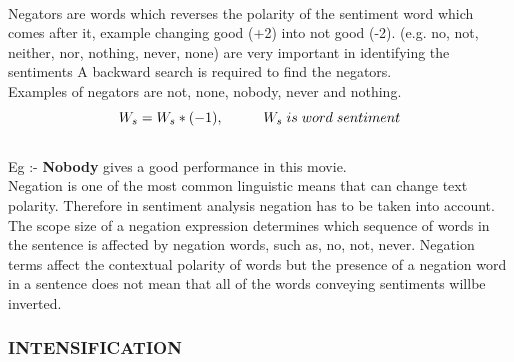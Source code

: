 \paragraph{}  Negators are words which reverses the polarity of the sentiment word which comes after it, example changing good (+2)
into not good (-2). (e.g. no, not, neither, nor, nothing, never,
none) are very important in identifying the sentiments
A backward search is required to find the negators.
\\
Examples of negators are not, none, nobody, never and nothing.
\begin{equation}
W_s = W_s * (-1), \hspace{1cm} W_s  \hspace{0.1cm}is \hspace{0.1cm}  word \hspace{0.1cm} sentiment
\end{equation}
\\
Eg :- \textbf{Nobody} gives a good performance in this movie.
\\
Negation is one of the most common linguistic means that can change text polarity. Therefore in sentiment analysis negation has to be  taken into account. The  scope size of a negation expression determines which sequence of words in the sentence is affected by negation words, such as, no, not, never. Negation terms affect the contextual polarity of words but the presence of a negation  word  in  a  sentence  does  not  mean that  all of the words conveying sentiments willbe  inverted.

\subsubsection{INTENSIFICATION}
